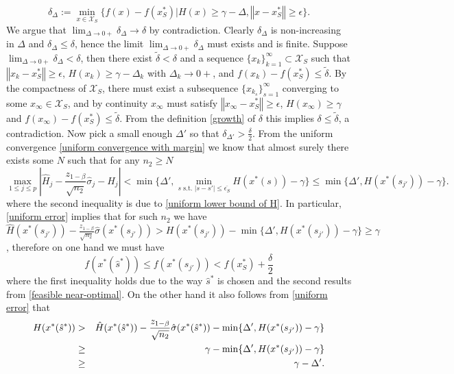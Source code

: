 \documentclass[mnsc,blindrev]{informs4} %
\newcommand{\norm}[1]{\left \Vert #1 \right\Vert}
\newcommand{\abs}[1]{\left \vert #1 \right\vert}
\begin{document}
\begin{equation}\label{optimality gap with relaxed constraint}
\delta_{\Delta}:=\min_{x\in\mathcal X_S}\{f(x)-f(x_S^*)\vert H(x)\geq\gamma-\Delta,\norm{x-x_S^*}\geq \epsilon\}.
\end{equation}
We argue that $\lim_{\Delta\to 0+}\delta_{\Delta}\to\delta$ by contradiction. Clearly $\delta_{\Delta}$ is non-increasing in $\Delta$ and $\delta_{\Delta}\leq \delta$, hence the limit $\lim_{\Delta\to 0+}\delta_{\Delta}$ must exists and is finite. Suppose $\lim_{\Delta\to 0+}\delta_{\Delta}<\delta$, then there exist $\tilde{\delta}<\delta$ and a sequence $\{x_k\}_{k=1}^{\infty}\subset \mathcal X_S$ such that $\norm{x_k-x_S^*}\geq \epsilon$, $H(x_k)\geq \gamma-\Delta_k$ with $\Delta_k\to 0+$, and $f(x_k)-f(x_S^*)\leq \tilde{\delta}$. By the compactness of $\mathcal X_S$, there must exist a subsequence $\{x_{k_s}\}_{s=1}^{\infty}$ converging to some $x_{\infty}\in\mathcal X_S$, and by continuity $x_{\infty}$ must satisfy $\norm{x_{\infty}-x_S^*}\geq \epsilon$, $H(x_{\infty})\geq \gamma$ and $f(x_{\infty})-f(x_S^*)\leq \tilde{\delta}$. From the definition \eqref{growth} of $\delta$ this implies $\delta\leq \tilde{\delta}$, a contradiction. Now pick a small enough $\Delta'$ so that $\delta_{\Delta'}>\frac{\delta}{2}$. From the uniform convergence \eqref{uniform convergence with margin} we know that almost surely there exists some $N$ such that for any $n_2\geq N$
\begin{equation}\label{uniform error}
\max_{1\leq j\leq p} \abs{\hat H_j-\frac{z_{1-\beta}}{\sqrt{n_2}}\hat{\sigma}_j-H_j}< \min\{\Delta',\min_{s\text{ s.t. }\lvert s-s'\rvert\leq \overline{\epsilon_S}}H(x^*(s))-\gamma\}\leq \min\{\Delta',H(x^*(s_{j'}))-\gamma\}.
\end{equation}
where the second inequality is due to \eqref{uniform lower bound of H}. In particular, \eqref{uniform error} implies that for such $n_2$ we have $\hat H(x^*(s_{j'}))-\frac{z_{1-\beta}}{\sqrt{n_2}}\hat{\sigma}(x^*(s_{j'}))>H(x^*(s_{j'}))-\min\{\Delta',H(x^*(s_{j'}))-\gamma\}\geq \gamma$,
therefore on one hand we must have
\begin{equation}\label{bound:objective value}
f(x^*(\hat s^*))\leq f(x^*(s_{j'}))<f(x_S^*)+\frac{\delta}{2}
\end{equation}
where the first inequality holds due to the way $\hat s^*$ is chosen and the second results from \eqref{feasible near-optimal}. On the other hand it also follows from \eqref{uniform error} that
\begin{eqnarray}
\notag H(x^*(\hat s^*))&>&\hat H(x^*(\hat s^*))-\frac{z_{1-\beta}}{\sqrt{n_2}}\hat{\sigma}(x^*(\hat s^*))-\min\{\Delta',H(x^*(s_{j'}))-\gamma\}\\
\notag&\geq& \gamma-\min\{\Delta',H(x^*(s_{j'}))-\gamma\}\\
&\geq& \gamma-\Delta'.\label{bound:constraint}
\end{eqnarray}
\end{document}
